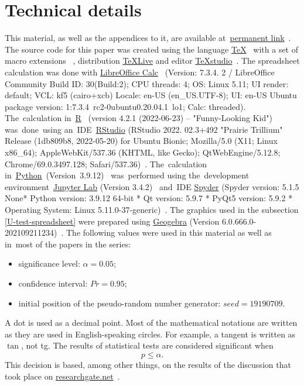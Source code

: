\documentclass[]{scrreprt}
\begin{document}
\chapter{Technical details}
This material, as well as the appendices to it, are available at~\href{https://github.com/Kirill-Murashev/AI_for_valuers_book/tree/main/Parts-Chapters/Mann-Whitney-Wilcoxon}{permanent link}~\cite{Murashev:u-test}. The source code for this paper was created using the language \href{https://www.ctan.org/}{\TeX}~\cite{TeX:site} with a set of macro extensions \href{https://www latex-project.org/}{\LaTeXe}~\cite{LaTeX:site}, distribution \href{https://www.tug.org/texlive/}{TeXLive} \cite{TeXLive:site} and editor \href{https://www.texstudio.org/}{TeXstudio}~\cite{TeXstudio:site}. The spreadsheet calculation was done with \href{https://www.libreoffice.org/discover/calc/}{LibreOffice Calc}~\cite{LO:Calc} (Version: 7.3.4. 2 / LibreOffice Community Build ID: 30(Build:2); CPU threads: 4; OS: Linux 5.11; UI render: default; VCL: kf5 (cairo+xcb) Locale: en-US (en\_US.UTF-8); UI: en-US Ubuntu package version: 1:7.3.4~rc2-0ubuntu0.20.04.1~lo1; Calc: threaded). The~calculation in~\href{https://www.r-project.org/}{R}~\cite{R_language} (version 4.2.1 (2022-06-23) -- "Funny-Looking Kid") was~done~using an~IDE~\href{https://www.rstudio.com/}{RStudio} (RStudio 2022. 02.3+492 "Prairie Trillium" Release (1db809b8, 2022-05-20) for Ubuntu Bionic; Mozilla/5.0 (X11; Linux x86\_64); AppleWebKit/537.36 (KHTML, like Gecko); QtWebEngine/5.12.8; Chrome/69.0.3497.128; Safari/537.36)~\cite{RStudio:official_site}. The~calculation in~\href{https://www.python.org/}{Python}~(Version~3.9.12)~\cite{Python:site} was~performed using the~development environment~\href{https://jupyter.org}{Jupyter Lab} (Version 3.4.2)~\cite{Jupyter:site} and~IDE \href{https://www.spyder-ide.org/}{Spyder} (Spyder version: 5.1.5 None* Python version: 3.9.12 64-bit * Qt version: 5.9.7 * PyQt5 version: 5.9.2
* Operating System: Linux 5.11.0-37-generic)~\cite{Spyder:site}. The graphics used in the subsection \ref{U-test-spreadsheet} were prepared using \href{Geogebra:official-site}{Geogebra} (Version 6.0.666.0-202109211234)~\cite{Geogebra:official-site}. The following values were used in this material as well as in~most of the papers in the series:
\begin{itemize}
	\item significance level: $\alpha = 0.05$;
	\item confidence interval: $Pr = 0.95$;
	\item initial position of the pseudo-random number generator: $seed=19190709$.
\end{itemize}
A dot is used as a decimal point. Most of the mathematical notations are written as they are used in English-speaking circles. For example, a tangent is written as~$\tan$, not tg. The results of statistical tests are considered significant when
\begin{equation}\label{eq:significance}
p \leq \alpha.
\end{equation}
This decision is based, among other things, on the results of the discussion that took place on \href{researchgate.net}{researchgate.net}~\cite{RG:p-equals-alpha}.
%
\end{document}

